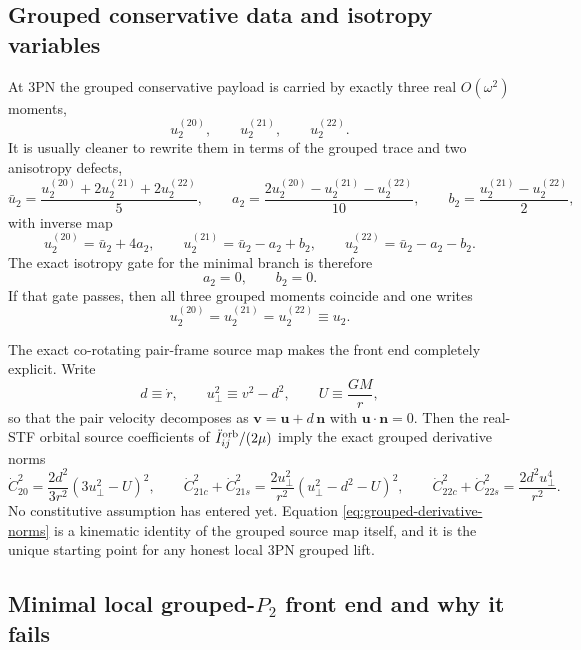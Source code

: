 \documentclass[11pt]{article}
\begin{document}
\subsection{Grouped conservative data and isotropy variables}
\label{sec:grouped-data}

At $3$PN the grouped conservative payload is carried by exactly three real
$O(\omega^2)$ moments,
\[
u_2^{(20)},\qquad u_2^{(21)},\qquad u_2^{(22)}.
\]
It is usually cleaner to rewrite them in terms of the grouped trace and two
anisotropy defects,
\begin{equation}
\bar u_2=\frac{u_2^{(20)}+2u_2^{(21)}+2u_2^{(22)}}{5},
\qquad
 a_2=\frac{2u_2^{(20)}-u_2^{(21)}-u_2^{(22)}}{10},
\qquad
 b_2=\frac{u_2^{(21)}-u_2^{(22)}}{2},
\label{eq:grouped-trace-defects}
\end{equation}
with inverse map
\begin{equation}
 u_2^{(20)}=\bar u_2+4a_2,
\qquad
 u_2^{(21)}=\bar u_2-a_2+b_2,
\qquad
 u_2^{(22)}=\bar u_2-a_2-b_2.
\label{eq:grouped-inverse-map}
\end{equation}
The exact isotropy gate for the minimal branch is therefore
\begin{equation}
\boxed{a_2=0,
\qquad
b_2=0.}
\label{eq:grouped-isotropy-gate}
\end{equation}
If that gate passes, then all three grouped moments coincide and one writes
\[
u_2^{(20)}=u_2^{(21)}=u_2^{(22)}\equiv u_2.
\]

The exact co-rotating pair-frame source map makes the front end completely
explicit.  Write
\[
d\equiv \dot r,
\qquad
u_\perp^2\equiv v^2-d^2,
\qquad
U\equiv \frac{GM}{r},
\]
so that the pair velocity decomposes as
\(\mathbf v=\mathbf u+d\,\mathbf n\) with
\(\mathbf u\!\cdot\!\mathbf n=0\).
Then the real-STF orbital source coefficients of
\(\ddot I_{ij}^{\rm orb}/(2\mu)\) imply the exact grouped derivative norms
\begin{equation}
\dot C_{20}^2=\frac{2d^2}{3r^2}(3u_\perp^2-U)^2,
\qquad
\dot C_{21c}^2+\dot C_{21s}^2=\frac{2u_\perp^2}{r^2}(u_\perp^2-d^2-U)^2,
\qquad
\dot C_{22c}^2+\dot C_{22s}^2=\frac{2d^2u_\perp^4}{r^2}.
\label{eq:grouped-derivative-norms}
\end{equation}
No constitutive assumption has entered yet.  Equation
\eqref{eq:grouped-derivative-norms} is a kinematic identity of the grouped
source map itself, and it is the unique starting point for any honest local
$3$PN grouped lift.

\subsection{Minimal local grouped-\texorpdfstring{$P_2$}{P 2} front end and why it fails}
\label{sec:grouped-minimal-failure}
\end{document}
